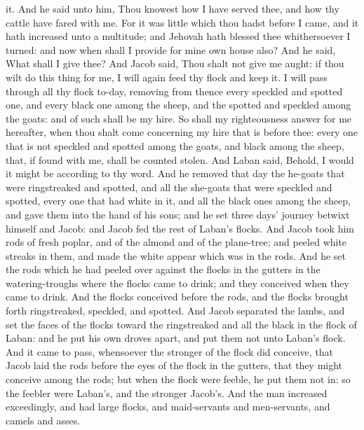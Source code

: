 it. And he said unto him, Thou knowest how I have served thee, and how thy cattle have fared with me. For it was little which thou hadst before I came, and it hath increased unto a multitude; and Jehovah hath blessed thee whithersoever I turned: and now when shall I provide for mine own house also? And he said, What shall I give thee? And Jacob said, Thou shalt not give me aught: if thou wilt do this thing for me, I will again feed thy flock and keep it. I will pass through all thy flock to-day, removing from thence every speckled and spotted one, and every black one among the sheep, and the spotted and speckled among the goats: and of such shall be my hire. So shall my righteousness answer for me hereafter, when thou shalt come concerning my hire that is before thee: every one that is not speckled and spotted among the goats, and black among the sheep, that, if found with me, shall be counted stolen. And Laban said, Behold, I would it might be according to thy word. And he removed that day the he-goats that were ringstreaked and spotted, and all the she-goats that were speckled and spotted, every one that had white in it, and all the black ones among the sheep, and gave them into the hand of his sons; and he set three days’ journey betwixt himself and Jacob: and Jacob fed the rest of Laban’s flocks.  And Jacob took him rods of fresh poplar, and of the almond and of the plane-tree; and peeled white streaks in them, and made the white appear which was in the rods. And he set the rods which he had peeled over against the flocks in the gutters in the watering-troughs where the flocks came to drink; and they conceived when they came to drink. And the flocks conceived before the rods, and the flocks brought forth ringstreaked, speckled, and spotted. And Jacob separated the lambs, and set the faces of the flocks toward the ringstreaked and all the black in the flock of Laban: and he put his own droves apart, and put them not unto Laban’s flock. And it came to pass, whensoever the stronger of the flock did conceive, that Jacob laid the rods before the eyes of the flock in the gutters, that they might conceive among the rods; but when the flock were feeble, he put them not in: so the feebler were Laban’s, and the stronger Jacob’s. And the man increased exceedingly, and had large flocks, and maid-servants and men-servants, and camels and asses. 

